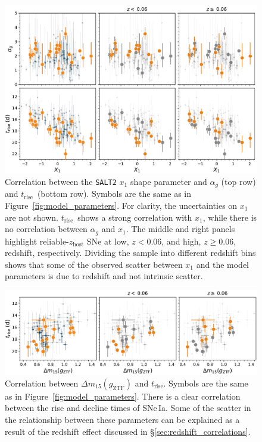 \documentclass[twocolumn]{./aastex63}
\newcommand{\trise}{$t_\mathrm{rise}$}
\begin{document}
\begin{figure}
    \centering
    \includegraphics[width=6in]{./figures/shape_correlations.pdf}
    \caption{Correlation between the \texttt{SALT2} $x_1$ shape parameter and
    $\alpha_g$ (top row) and \trise\ (bottom row). Symbols are the same as in
    Figure~\ref{fig:model_parameters}. For clarity, the uncertainties on $x_1$
    are not shown. \trise\ shows a strong correlation with $x_1$, while there is
    no correlation between $\alpha_g$ and $x_1$. The middle and right panels
    highlight reliable-$z_\mathrm{host}$ SNe at low, $z < 0.06$, and high, $z
    \ge 0.06$, redshift, respectively. Dividing the sample into different
    redshift bins shows that some of the observed scatter between $x_1$ and the
    model parameters is due to redshift and not intrinsic scatter. }
    \label{fig:shape_correlations}
\end{figure}

\begin{figure}
    \centering
    \includegraphics[width=6in]{./figures/dm15_rise.pdf}
    \caption{Correlation between $\Delta m_{15}(g_\mathrm{ZTF})$ and \trise.
    Symbols are the same as in Figure~\ref{fig:model_parameters}. There is a
    clear correlation between the rise and decline times of SNe\,Ia. Some of the
    scatter in the relationship between these parameters can be explained as a
    result of the redshift effect discussed in
    \S\ref{sec:redshift_correlations}.}
    \label{fig:dm15}
\end{figure}
\end{document}
